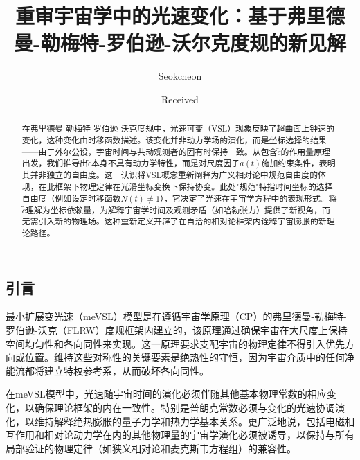 \documentclass[jkps,preprint,fleqn]{revtex4}
\newcommand{\tc}{\tilde{c}}
\begin{document}
\begin{CJK*}{UTF8}{gbsn}
\setcounter{page}{0}

\title[]{重审宇宙学中的光速变化：基于弗里德曼-勒梅特-罗伯逊-沃尔克度规的新见解}
\author{Seokcheon }

\date[]{Received }

\begin{abstract}
在弗里德曼-勒梅特-罗伯逊-沃克度规中，光速可变（VSL）现象反映了超曲面上钟速的变化，这种变化由时移函数描述。该变化并非动力学场的演化，而是坐标选择的结果——由于外尔公设，宇宙时间与共动观测者的固有时保持一致。从包含$\tc$的作用量原理出发，我们推导出$\tc$本身不具有动力学特性，而是对尺度因子$a(t)$施加约束条件，表明其并非独立的自由度。这一认识将VSL概念重新阐释为广义相对论中规范自由度的体现，在此框架下物理定律在光滑坐标变换下保持协变。此处"规范"特指时间坐标的选择自由度（例如设定时移函数$N(t) \neq 1$），它决定了光速在宇宙学方程中的表现形式。将$\tc$理解为坐标依赖量，为解释宇宙学时间及观测矛盾（如哈勃张力）提供了新视角，而无需引入新的物理场。这种重新定义开辟了在自洽的相对论框架内诠释宇宙膨胀的新理论路径。
\end{abstract}

\maketitle

\tableofcontents
\section{引言}
\label{sec:intro}

最小扩展变光速（meVSL）模型是在遵循宇宙学原理（CP）的弗里德曼-勒梅特-罗伯逊-沃克（FLRW）度规框架内建立的，该原理通过确保宇宙在大尺度上保持空间均匀性和各向同性来实现\cite{Lee:2020zts,Lee:2023bjz,Lee:2024mal}。这一原理要求支配宇宙的物理定律不得引入优先方向或位置。维持这些对称性的关键要素是绝热性的守恒，因为宇宙介质中的任何净能流都将建立特权参考系，从而破坏各向同性\cite{Lee:2022heb}。

在meVSL模型中，光速随宇宙时间的演化必须伴随其他基本物理常数的相应变化，以确保理论框架的内在一致性。特别是普朗克常数必须与变化的光速协调演化，以维持解释绝热膨胀的量子力学和热力学基本关系\cite{Lee:2022heb}。更广泛地说，包括电磁相互作用和相对论动力学在内的其他物理量的宇宙学演化必须被诱导，以保持与所有局部验证的物理定律（如狭义相对论和麦克斯韦方程组）的兼容性\cite{Lee:2020zts,Lee:2023bjz,Lee:2024mal,Lee:2022heb}。


\end{CJK*}
\end{document}
